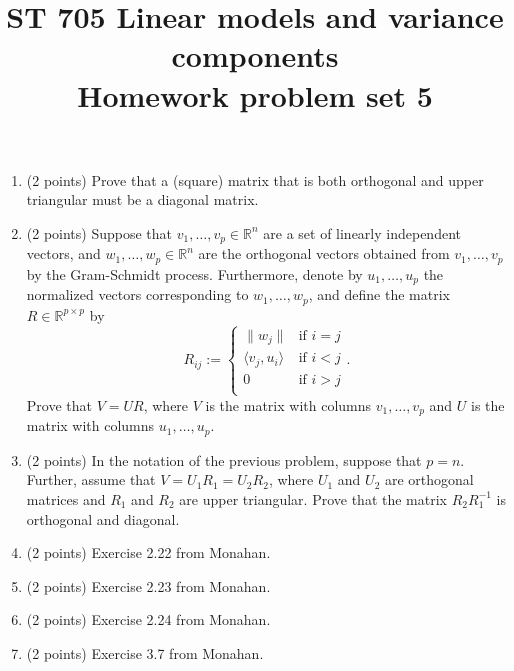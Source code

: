 \documentclass[11pt]{article}
\title{ST 705 Linear models and variance components \\ 
        Homework problem set 5}
\begin{document}
\maketitle

\begin{enumerate}

\item(2 points) Prove that a (square) matrix that is both orthogonal and upper triangular must be a diagonal matrix.

\item(2 points) Suppose that $v_{1},\dots,v_{p} \in \mathbb{R}^{n}$ are a set of linearly independent vectors, and $w_{1},\dots,w_{p} \in \mathbb{R}^{n}$ are the orthogonal vectors obtained from $v_{1},\dots,v_{p}$ by the Gram-Schmidt process.  Furthermore, denote by $u_{1},\dots,u_{p}$ the normalized vectors corresponding to $w_{1},\dots,w_{p}$, and define the matrix $R \in \mathbb{R}^{p\times p}$ by
\[
R_{ij} :=
\begin{cases}
\|w_{j}\| & \text{if } i=j \\
\langle v_{j}, u_i\rangle & \text{if } i<j \\
0 & \text{if } i>j \\
\end{cases}.
\]
Prove that $V = UR$, where $V$ is the matrix with columns $v_{1},\dots,v_{p}$ and $U$ is the matrix with columns $u_{1},\dots,u_{p}$.

\item(2 points) In the notation of the previous problem, suppose that $p = n$.  Further, assume that $V = U_{1}R_{1} = U_{2}R_{2}$, where $U_{1}$ and $U_{2}$ are orthogonal matrices and $R_{1}$ and $R_{2}$ are upper triangular.  Prove that the matrix $R_{2}R_{1}^{-1}$ is orthogonal and diagonal.

\item(2 points) Exercise 2.22 from Monahan.

\item(2 points) Exercise 2.23 from Monahan.

\item(2 points) Exercise 2.24 from Monahan.

\item(2 points) Exercise 3.7 from Monahan.

\end{enumerate}
\end{document}
